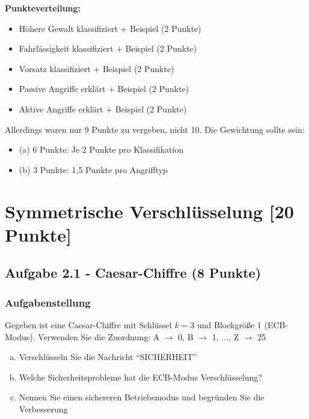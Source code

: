 \documentclass[12pt,a4paper]{article}
\begin{document}
\textbf{Punkteverteilung:}
\begin{itemize}
    \item Höhere Gewalt klassifiziert + Beispiel (2 Punkte) \checkmark
    \item Fahrlässigkeit klassifiziert + Beispiel (2 Punkte) \checkmark
    \item Vorsatz klassifiziert + Beispiel (2 Punkte) \checkmark
    \item Passive Angriffe erklärt + Beispiel (2 Punkte) \checkmark
    \item Aktive Angriffe erklärt + Beispiel (2 Punkte) \checkmark
\end{itemize}

Allerdings waren nur 9 Punkte zu vergeben, nicht 10. Die Gewichtung sollte sein:
\begin{itemize}
    \item (a) 6 Punkte: Je 2 Punkte pro Klassifikation
    \item (b) 3 Punkte: 1,5 Punkte pro Angrifftyp
\end{itemize}


\newpage

\section{Symmetrische Verschlüsselung [20 Punkte]}

\subsection{Aufgabe 2.1 - Caesar-Chiffre (8 Punkte)}

\subsubsection*{Aufgabenstellung}

Gegeben ist eine Caesar-Chiffre mit Schlüssel $k = 3$ und Blockgröße 1 (ECB-Modus).
Verwenden Sie die Zuordnung: A $\to$ 0, B $\to$ 1, ..., Z $\to$ 25

\begin{enumerate}[(a)]
    \item Verschlüsseln Sie die Nachricht ``SICHERHEIT''
    \item Welche Sicherheitsprobleme hat die ECB-Modus Verschlüsselung?
    \item Nennen Sie einen sichereren Betriebsmodus und begründen Sie die Verbesserung
\end{enumerate}
\end{document}
